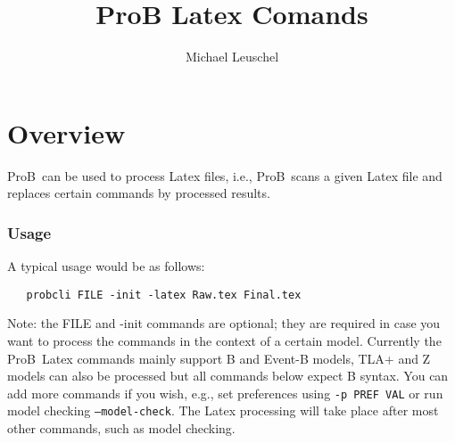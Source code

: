 \documentclass[final]{llncs}
\newcommand{\prob}{{\sc ProB}}
\begin{document}
%


\pagestyle{empty}  %

%
\mainmatter              %
%

\title{ProB Latex Comands}
%
%
\author{Michael Leuschel}
%
%
\tocauthor{}
%

\maketitle              %


\section{Overview}

\prob\ can be used to process Latex files, i.e., \prob{}ans a given Latex file
 and replaces certain commands by processed results.

\subsubsection*{Usage}
A typical usage would be as follows: 

\begin{verbatim}
   probcli FILE -init -latex Raw.tex Final.tex
\end{verbatim}

Note: the FILE and -init commands are optional; they are required in case you want to
process the commands in the context of a certain model.
Currently the \prob\ Latex commands mainly support B and Event-B models, 
 TLA+ and Z models can also be processed but all commands below expect B syntax.
You can add more commands if you wish, e.g., set preferences using {\tt -p PREF VAL}
 or run model checking {\tt --model-check}.
The Latex processing will take place after most other commands, such as model checking.
\end{document}
